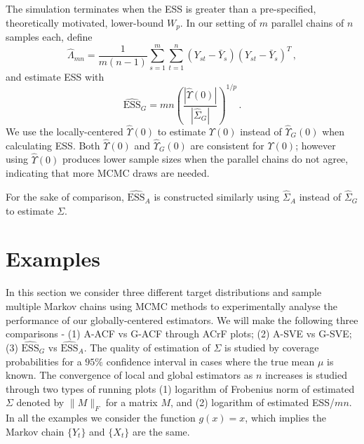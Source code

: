 \documentclass[11pt]{article}
\theoremstyle{remark}
\begin{document}
The simulation terminates when the ESS is greater than a pre-specified, theoretically motivated, lower-bound $W_{p}$. 
%
In our setting of $m$ parallel chains of $n$ samples each, define
%
\[
\hat{\Lambda}_{mn} = \dfrac{1}{m(n-1)}\sum_{s=1}^{m}\sum_{t=1}^{n}(Y_{st} - \bar{Y}_s)(Y_{st} - \bar{Y}_s)^T\, ,
\]
and estimate ESS with
\[
\widehat{\textrm{ESS}}_G = mn\left(\dfrac{|\hat{\Upsilon}(0)|}{|\hat{\Sigma}_{G}|}\right)^{1/p}\, .
\]
We use the locally-centered $\hat{\Upsilon}(0)$ to estimate $\Upsilon(0)$ instead of $\hat{\Upsilon}_G(0)$ when calculating ESS. Both $\hat{\Upsilon}(0)$ and $\hat{\Upsilon}_G(0)$ are consistent  for $\Upsilon(0)$; however using $\hat{\Upsilon}(0)$ produces lower sample sizes when the parallel chains do not agree, indicating that more MCMC draws are needed.

For the sake of comparison, $\widehat{\textrm{ESS}}_A$ is constructed similarly using $\hat{\Sigma}_A$ instead of $\hat{\Sigma}_G$ to estimate $\Sigma$.  


\section{Examples} \label{sec:examples}

In this section we consider three different target distributions and sample multiple Markov chains using MCMC methods to experimentally analyse the performance of our globally-centered estimators. We will make the following three comparisons - (1) A-ACF vs G-ACF through ACrF plots; (2) A-SVE vs G-SVE; (3) $\widehat{\textrm{ESS}}_G$ vs $\widehat{\textrm{ESS}}_A$. The quality of estimation of $\Sigma$ is studied by coverage probabilities for a $95 \%$ confidence interval in cases where the true mean $\mu$ is known. The convergence of local and global estimators as $n$ increases is studied through two types of running plots (1) logarithm of Frobenius norm of estimated $\Sigma$ denoted by $\|M\|_F$ for a matrix $M$, and (2) logarithm of estimated ESS/$mn$. In all the examples we consider the function $g(x) = x$, which implies the Markov chain $\{Y_t\}$ and $\{X_t\}$ are the same.
\end{document}
